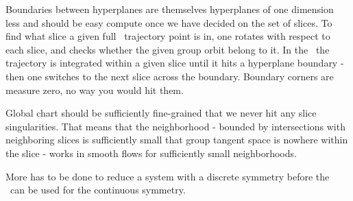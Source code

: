 Boundaries
between hyperplanes are themselves hyperplanes of one dimension less and
should be easy compute once we have decided on the set of slices. To find
what slice a given full \statesp\ trajectory point is in, one rotates
with respect to each slice, and checks whether the given group orbit
belong to it. In the \reducedsp\ the trajectory is integrated within a
given slice until it hits a hyperplane boundary - then one switches to
the next slice across the boundary. Boundary corners are measure zero, no
way you would hit them.

Global chart should be sufficiently fine-grained that we never hit any
slice singularities. That means that the neighborhood - bounded by
intersections with neighboring slices is sufficiently small that group
tangent space is nowhere within the slice - works in smooth flows
for sufficiently small neighborhoods.


More has to be done to reduce a system with a discrete
symmetry before the \mslices\ can be used for the continuous symmetry.
